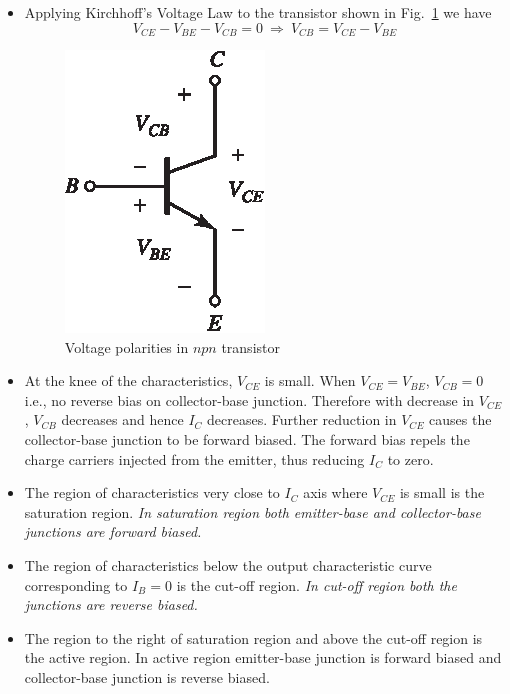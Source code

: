 \begin{itemize}
\item Applying Kirchhoff's Voltage Law to the transistor shown in Fig.~\ref{fig3.30} we have 
$$
V_{CE}-V_{BE}-V_{CB}=0 \ \Rightarrow \ V_{CB}=V_{CE}-V_{BE}
$$
\begin{figure}[H]
\centering
\includegraphics{chap2/S3-EE-03-030.eps}
\caption{Voltage polarities in $npn$ transistor}\label{fig3.30}
\end{figure}

\eject

\item At the knee of the characteristics, $V_{CE}$ is small. When $V_{CE}=V_{BE}$, $V_{CB}=0$ i.e., no reverse bias on collector-base junction. Therefore with decrease in $V_{CE}$, $V_{CB}$ decreases and hence $I_{C}$ decreases. Further reduction in $V_{CE}$ causes the collector-base junction to be forward biased. The forward bias repels the charge carriers injected from the emitter, thus reducing $I_{C}$ to zero.

\item The region of characteristics very close to $I_{C}$ axis where $V_{CE}$ is small is the saturation region. {\em In saturation region both emitter-base and collector-base junctions are forward biased.}

\item The region of characteristics below the output characteristic curve corresponding to $I_{B}=0$ is the cut-off region. {\em In cut-off region both the junctions are reverse biased.}

\item The region to the right of saturation region and above the cut-off region is the active region. In active region emitter-base junction is forward biased and collector-base junction is reverse biased.
\end{itemize}

